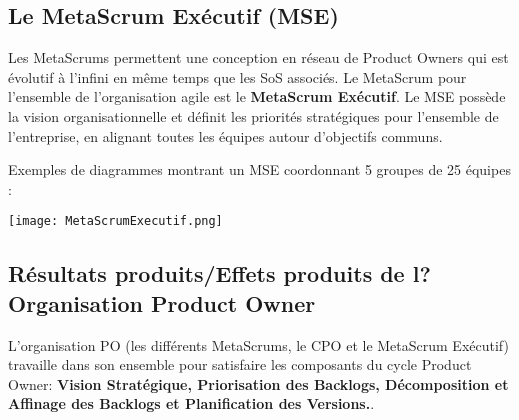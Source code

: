 \documentclass[12pt,a4paper,parskip=full]{scrartcl}
\begin{document}
\subsection{Le MetaScrum Exécutif (MSE)}
Les MetaScrums permettent une conception en réseau de Product Owners qui est
évolutif à l'infini en même temps que les SoS associés. Le MetaScrum pour l'ensemble
de l'organisation agile est le \textbf{MetaScrum Exécutif}. Le MSE possède la vision
organisationnelle et définit les priorités stratégiques pour l'ensemble de l'entreprise, en
alignant toutes les équipes autour d'objectifs communs.

Exemples de diagrammes montrant un MSE coordonnant 5 groupes de 25 équipes :

\texttt{[image: MetaScrumExecutif.png]}

\subsection{Résultats produits/Effets produits de l?Organisation Product
Owner}
L'organisation PO (les différents MetaScrums, le CPO et le MetaScrum Exécutif)
travaille dans son ensemble pour satisfaire les composants du cycle Product Owner:
\textbf{Vision Stratégique, Priorisation des Backlogs, Décomposition et Affinage des
Backlogs et Planification des Versions.}.
\end{document}
